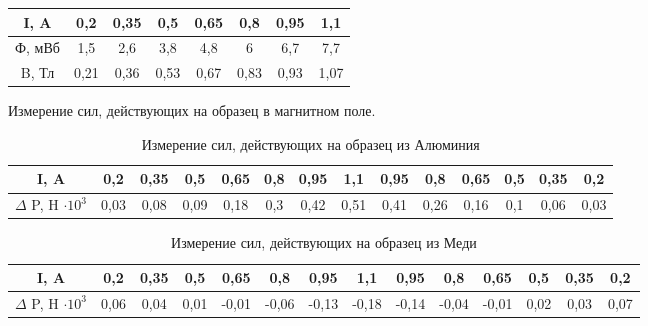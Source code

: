 \documentclass[a4paper, 12pt]{article}
\begin{document}
\begin{table}[!h]
	\centering
	\begin{tabular}{|c|c|c|c|c|c|c|c|}
		\hline
		I, A   & 0,2  & 0,35 & 0,5  & 0,65 & 0,8  & 0,95 & 1,1  \\ \hline
		Ф, мВб & 1,5  & 2,6  & 3,8  & 4,8  & 6    & 6,7  & 7,7  \\ \hline
		B, Тл  & 0,21 & 0,36 & 0,53 & 0,67 & 0,83 & 0,93 & 1,07 \\ \hline
	\end{tabular}
\end{table}

Измерение сил, действующих на образец в магнитном поле. \\
\begin{table}[!h]
	\centering
	\begin{tabular}{|c|c|c|c|c|c|c|c|c|c|c|c|c|c|}
		\hline
		I, A          & 0,2  & 0,35 & 0,5  & 0,65 & 0,8 & 0,95 & 1,1  & 0,95 & 0,8  & 0,65 & 0,5 & 0,35 & 0,2  \\ \hline
		$\Delta$ P, H $\cdot 10^{3}$ & 0,03 & 0,08 & 0,09 & 0,18 & 0,3 & 0,42 & 0,51 & 0,41 & 0,26 & 0,16 & 0,1 & 0,06 & 0,03 \\ \hline
	\end{tabular}
\caption{Измерение сил, действующих на образец из Алюминия}
\end{table}

\begin{table}[!h]
	\centering
	\begin{tabular}{|c|c|c|c|c|c|c|c|c|c|c|c|c|c|}
		\hline
		I, A          & 0,2  & 0,35 & 0,5  & 0,65  & 0,8   & 0,95  & 1,1   & 0,95  & 0,8   & 0,65  & 0,5  & 0,35 & 0,2  \\ \hline
		$\Delta$ P, H $\cdot 10^{3}$ & 0,06 & 0,04 & 0,01 & -0,01 & -0,06 & -0,13 & -0,18 & -0,14 & -0,04 & -0,01 & 0,02 & 0,03 & 0,07 \\ \hline
	\end{tabular}
\caption{Измерение сил, действующих на образец из Меди}
\end{table}

\newpage 
\end{document}
